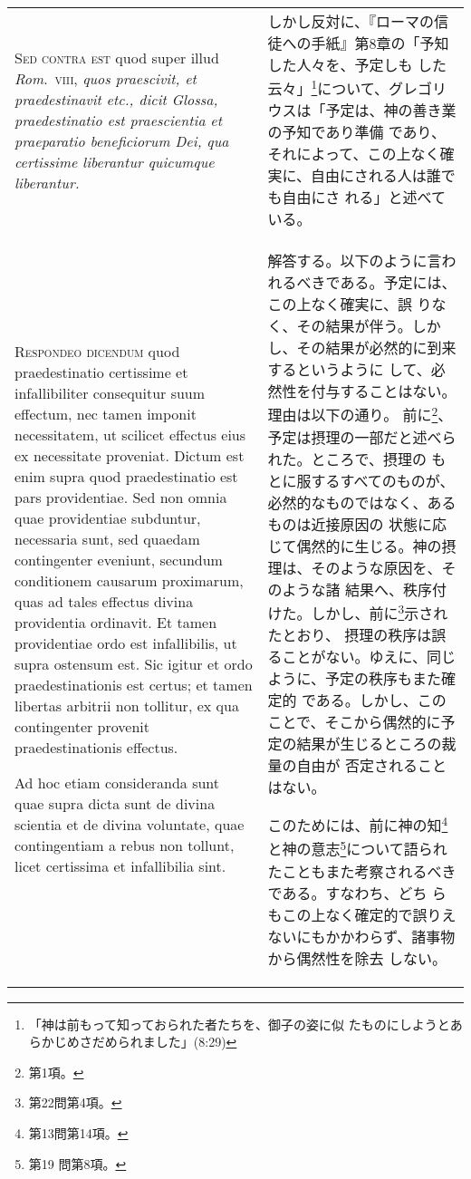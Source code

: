 \documentclass[10pt]{jsarticle} %
\begin{document}
\begin{longtable}{p{21em}p{21em}}
{\scshape Sed contra est} quod super illud {\itshape Rom}.~{\scshape viii},
{\itshape quos praescivit, et praedestinavit etc., dicit Glossa, praedestinatio
est praescientia et praeparatio beneficiorum Dei, qua certissime
liberantur quicumque liberantur.}


&

しかし反対に、『ローマの信徒への手紙』第8章の「予知した人々を、予定しも
 した云々」\footnote{「神は前もって知っておられた者たちを、御子の姿に似
 たものにしようとあらかじめさだめられました」(8:29)}について、グレゴリウスは「予定は、神の善き業の予知であり準備
 であり、それによって、この上なく確実に、自由にされる人は誰でも自由にさ
 れる」と述べている。


\\


{\scshape Respondeo dicendum} quod praedestinatio
certissime et infallibiliter consequitur suum effectum, nec tamen
imponit necessitatem, ut scilicet effectus eius ex necessitate
proveniat. Dictum est enim supra quod praedestinatio est pars
providentiae. Sed non omnia quae providentiae subduntur, necessaria
sunt, sed quaedam contingenter eveniunt, secundum conditionem causarum
proximarum, quas ad tales effectus divina providentia ordinavit. Et
tamen providentiae ordo est infallibilis, ut supra ostensum est. Sic
igitur et ordo praedestinationis est certus; et tamen libertas arbitrii
non tollitur, ex qua contingenter provenit praedestinationis
effectus. 

\hspace{2em}Ad hoc etiam consideranda sunt quae supra dicta sunt de divina
scientia et de divina voluntate, quae contingentiam a rebus non tollunt,
licet certissima et infallibilia sint.


&


解答する。以下のように言われるべきである。予定には、この上なく確実に、誤
 りなく、その結果が伴う。しかし、その結果が必然的に到来するというように
 して、必然性を付与することはない。理由は以下の通り。
前に\footnote{第1項。}、予定は摂理の一部だと述べられた。ところで、摂理の
 もとに服するすべてのものが、必然的なものではなく、あるものは近接原因の
 状態に応じて偶然的に生じる。神の摂理は、そのような原因を、そのような諸
 結果へ、秩序付けた。しかし、前に\footnote{第22問第4項。}示されたとおり、
 摂理の秩序は誤ることがない。ゆえに、同じように、予定の秩序もまた確定的
 である。しかし、このことで、そこから偶然的に予定の結果が生じるところの裁量の自由が
 否定されることはない。

\hspace{1zw}このためには、前に神の知\footnote{第13問第14項。}と神の意志\footnote{第19
 問第8項。}について語られたこともまた考察されるべきである。すなわち、どち
 らもこの上なく確定的で誤りえないにもかかわらず、諸事物から偶然性を除去
 しない。



\end{longtable}
\end{document}
